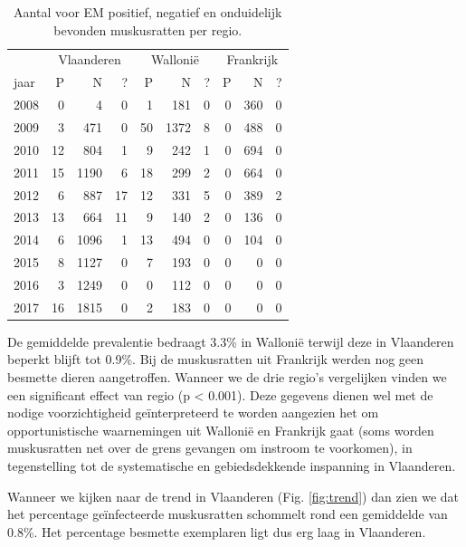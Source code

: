 \documentclass[twoside]{extreport}
\begin{document}
\begin{table}

\caption{\label{tab:regio}Aantal voor EM positief, negatief en onduidelijk bevonden muskusratten per regio.}
\centering
\begin{tabular}[t]{l|r|r|r|r|r|r|r|r|r}
\hline
\multicolumn{1}{c|}{ } & \multicolumn{3}{c|}{Vlaanderen} & \multicolumn{3}{c|}{Wallonië} & \multicolumn{3}{c}{Frankrijk} \\
\cline{2-4} \cline{5-7} \cline{8-10}
jaar & P & N & ? & P & N & ? & P & N & ?\\
\hline
2008 & 0 & 4 & 0 & 1 & 181 & 0 & 0 & 360 & 0\\
\hline
2009 & 3 & 471 & 0 & 50 & 1372 & 8 & 0 & 488 & 0\\
\hline
2010 & 12 & 804 & 1 & 9 & 242 & 1 & 0 & 694 & 0\\
\hline
2011 & 15 & 1190 & 6 & 18 & 299 & 2 & 0 & 664 & 0\\
\hline
2012 & 6 & 887 & 17 & 12 & 331 & 5 & 0 & 389 & 2\\
\hline
2013 & 13 & 664 & 11 & 9 & 140 & 2 & 0 & 136 & 0\\
\hline
2014 & 6 & 1096 & 1 & 13 & 494 & 0 & 0 & 104 & 0\\
\hline
2015 & 8 & 1127 & 0 & 7 & 193 & 0 & 0 & 0 & 0\\
\hline
2016 & 3 & 1249 & 0 & 0 & 112 & 0 & 0 & 0 & 0\\
\hline
2017 & 16 & 1815 & 0 & 2 & 183 & 0 & 0 & 0 & 0\\
\hline
\end{tabular}
\end{table}

De gemiddelde prevalentie bedraagt 3.3\% in Wallonië terwijl deze in
Vlaanderen beperkt blijft tot 0.9\%. Bij de muskusratten uit Frankrijk
werden nog geen besmette dieren aangetroffen. Wanneer we de drie regio's
vergelijken vinden we een significant effect van regio (p \textless{}
0.001). Deze gegevens dienen wel met de nodige voorzichtigheid
geïnterpreteerd te worden aangezien het om opportunistische waarnemingen
uit Wallonië en Frankrijk gaat (soms worden muskusratten net over de
grens gevangen om instroom te voorkomen), in tegenstelling tot de
systematische en gebiedsdekkende inspanning in Vlaanderen.

Wanneer we kijken naar de trend in Vlaanderen (Fig. \ref{fig:trend}) dan
zien we dat het percentage geïnfecteerde muskusratten schommelt rond een
gemiddelde van 0.8\%. Het percentage besmette exemplaren ligt dus erg
laag in Vlaanderen.
\end{document}
